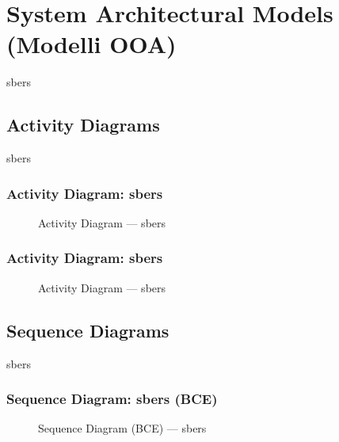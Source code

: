 \section{System Architectural Models (Modelli OOA)}

sbers

\subsection{Activity Diagrams}

sbers

\subsubsection{Activity Diagram: sbers}
\begin{figure}[H]
    \centering
    \caption{Activity Diagram --- sbers}
    \label{fig:act_01}
\end{figure}

\subsubsection{Activity Diagram: sbers}
\begin{figure}[H]
    \centering
    \caption{Activity Diagram --- sbers}
    \label{fig:act_02}
\end{figure}

\newpage
\subsection{Sequence Diagrams}

sbers

\subsubsection{Sequence Diagram: sbers (BCE)}
\begin{figure}[H]
    \centering
    \caption{Sequence Diagram (BCE) --- sbers}
    \label{fig:seq_01}
\end{figure}

